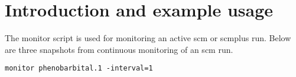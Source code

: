 



\maketitle
\newcommand{\guidetoolname}{monitor}
\tableofcontents
\newpage

\section{Introduction and example usage}
The monitor script is used for monitoring an active scm or scmplus run.
Below are three snapshots from continuous monitoring of an scm run.
\begin{verbatim}
monitor phenobarbital.1 -interval=1
\end{verbatim}
